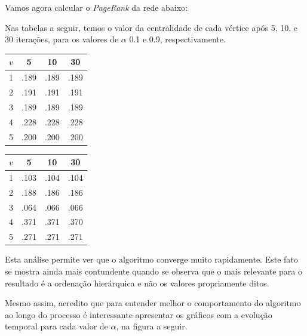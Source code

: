 \documentclass[l15, tikzdraw]{homework}
\begin{document}
	\subquest{}%
	Vamos agora calcular o \textit{PageRank} da rede abaixo:
	
	\begin{fig}
		
	\end{fig}

	Nas tabelas a seguir, temos o valor da centralidade de cada vértice após 5, 10, e 30 iterações, para os valores de $\alpha$ 0.1 e 0.9, respectivamente.

	\begin{multicols}{2}
		\begin{fig}[$\alpha = 0.1$]
			\begin{tabular}{|c|c|c|c|}
				\hline
				$v$ & 5 & 10 & 30\\
				\hline
				1 & .189 & .189 & .189\\
				\hline
				2 & .191 & .191 & .191\\
				\hline
				3 & .189 & .189 & .189\\
				\hline
				4 & .228 & .228 & .228\\
				\hline
				5 & .200 & .200 & .200\\
				\hline
			\end{tabular}
		\end{fig}
	
		\begin{fig}[$\alpha = 0.9$]
			\begin{tabular}{|c|c|c|c|}
				\hline
				$v$ & 5 & 10 & 30\\
				\hline
				1 & .103 & .104 & .104\\
				\hline
				2 & .188 & .186 & .186\\
				\hline
				3 & .064 & .066 & .066\\
				\hline
				4 & .371 & .371 & .370\\
				\hline
				5 & .271 & .271 & .271\\
				\hline
			\end{tabular}
		\end{fig}
	\end{multicols}

	Esta análise permite ver que o algoritmo converge muito rapidamente. Este fato se mostra ainda mais contundente quando se observa que o mais relevante para o resultado é a ordenação hierárquica e não os valores propriamente ditos.\par

	Mesmo assim, acredito que para entender melhor o comportamento do algoritmo ao longo do processo é interessante apresentar os gráficos com a evolução temporal para cada valor de $\alpha$, na figura a seguir.
\end{document}
